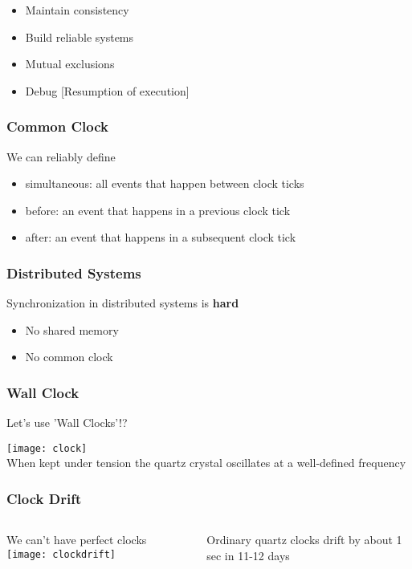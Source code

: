 \documentclass[aspectratio=169, 15pt,usenames,dvipsnames]{beamer}
\begin{document}
{\begin{gdblank}
\begin{itemize}
			\item Maintain consistency
			\item Build reliable systems
			      \pause
			\item Mutual exclusions
			\item Debug [Resumption of execution]
		\end{itemize}
	\end{gdblank}
	\begin{gdblank}
		\frametitle{Common Clock}
		\LARGE
		We can reliably define
		\pause
		\begin{itemize}
			\item simultaneous: all events that happen between clock ticks
			      \pause
			\item before: an event that happens in a previous clock tick
			      \pause
			\item after: an event that happens in a subsequent clock tick
		\end{itemize}
	\end{gdblank}
	\begin{gdblank}
		\frametitle{Distributed Systems}
		\LARGE
		Synchronization in distributed systems is \bf hard
		\begin{itemize}
			\item No shared memory
			\item No common clock
		\end{itemize}
	\end{gdblank}
	\begin{gdblank}
		\frametitle{Wall Clock}		
		\centering
		\LARGE	
		Let's use 'Wall Clocks'!?
		\par
		\texttt{[image: clock]}
		\small
		\\When kept under tension the quartz crystal oscillates at a well-defined frequency
	\end{gdblank}
	\begin{gdblank}
		\frametitle{Clock Drift}
		\begin{columns}
			\begin{column}{0.6\textwidth}
				We can't have perfect clocks
				\texttt{[image: clockdrift]}
			\end{column}
			\begin{column}{0.4\textwidth}
				Ordinary quartz clocks drift by about 1 sec in 11-12 days
			\end{column}
		\end{columns}
	\end{gdblank}
	\begin{gdblank}

\end{gdblank}}
\end{document}
